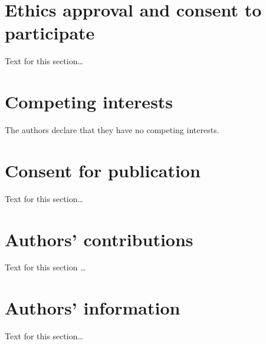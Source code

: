 \documentclass{bmcart}
\begin{document}
{\begin{backmatter}
\section*{Ethics approval and consent to participate}%
Text for this section\ldots

\section*{Competing interests}
The authors declare that they have no competing interests.

\section*{Consent for publication}%
Text for this section\ldots

\section*{Authors' contributions}
Text for this section \ldots

\section*{Authors' information}%
Text for this section\ldots




\end{backmatter}}
\end{document}
